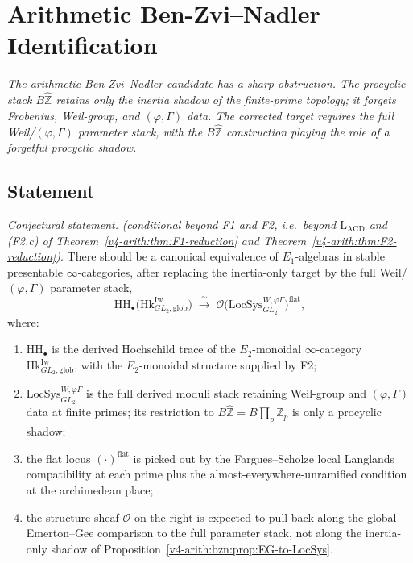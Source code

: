 \chapter{Arithmetic Ben-Zvi--Nadler Identification}
\label{v4-arith:arith-bzn}

\emph{The arithmetic Ben-Zvi--Nadler candidate has a sharp obstruction.
The procyclic stack \(B\widehat{\mathbb{Z}}\) retains only the
inertia shadow of the finite-prime topology; it forgets Frobenius,
Weil-group, and \((\varphi,\Gamma)\) data. The corrected target requires
the full Weil/\((\varphi,\Gamma)\) parameter stack, with the
\(B\widehat{\mathbb{Z}}\) construction playing the role of a
forgetful procyclic shadow.}

\section{Statement}
\label{v4-arith:bzn:statement}

\begin{conjecture}
\label{v4-arith:bzn:thm:main}
\emph{Conjectural statement.} \emph{(conditional beyond F1 and F2, i.e.\ beyond
\(\mathrm{L}_{\mathrm{ACD}}\) and (F2.c) of
Theorem~\ref{v4-arith:thm:F1-reduction} and Theorem~\ref{v4-arith:thm:F2-reduction})}.
There should be a canonical equivalence of \(E_{1}\)-algebras in stable
presentable \(\infty\)-categories, after replacing the inertia-only
target by the full Weil/\((\varphi,\Gamma)\) parameter stack,
\begin{equation}
\label{v4-arith:bzn:eq:main}
\mathrm{HH}_{\bullet}\bigl(\mathrm{Hk}^{\mathrm{Iw}}_{GL_{2},\mathrm{glob}}\bigr)\;\xrightarrow{\;\sim\;}\;\mathcal{O}\bigl(\mathrm{LocSys}^{W,\varphi\Gamma}_{GL_{2}}\bigr)^{\mathrm{flat}},
\end{equation}
where:
\begin{enumerate}
\item \(\mathrm{HH}_{\bullet}\) is the derived Hochschild trace of
the \(E_{2}\)-monoidal \(\infty\)-category \(\mathrm{Hk}^{\mathrm{Iw}}_{GL_{2},\mathrm{glob}}\),
with the \(E_{2}\)-monoidal structure supplied by F2;
\item \(\mathrm{LocSys}^{W,\varphi\Gamma}_{GL_{2}}\) is the full
derived moduli stack retaining Weil-group and \((\varphi,\Gamma)\)
data at finite primes; its restriction to
\(B\widehat{\mathbb{Z}}=B\prod_{p}\mathbb{Z}_{p}\) is only a procyclic
shadow;
\item the flat locus \((\cdot)^{\mathrm{flat}}\) is picked out by
the Fargues--Scholze local Langlands compatibility at each prime
plus the almost-everywhere-unramified condition at the archimedean
place;
\item the structure sheaf \(\mathcal{O}\) on the right is expected
to pull back along the global Emerton--Gee comparison to the full
parameter stack, not along the inertia-only shadow of
Proposition~\ref{v4-arith:bzn:prop:EG-to-LocSys}.
\end{enumerate}
\end{conjecture}

